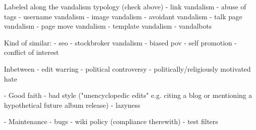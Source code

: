   Labeled along the vandalism typology (check above)
  - link vandalism
  - abuse of tags
  - username vandalism
  - image vandalism
  - avoidant vandalism
  - talk page vandalism
  - page move vandalism
  - template vandalism
  - vandalbots

  Kind of similar:
  - seo
  - stockbroker vandalism
  - biased pov
  - self promotion
  - conflict of interest

Inbetween
- edit warring
- political controversy
- politically/religiously motivated hate

- Good faith
  - bad style ("unencyclopedic edits" e.g. citing a blog or mentioning a hypothetical future album release)
  - lazyness


- Maintenance
  - bugs
  - wiki policy (compliance therewith)
  - test filters

